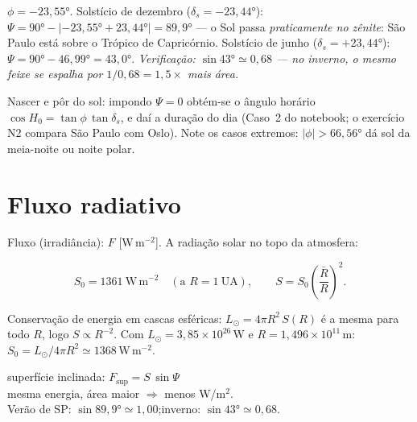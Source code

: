 \documentclass[11pt]{article}
\begin{document}
\begin{exemplo}
$\phi = -23{,}55°$. Solstício de dezembro ($\delta_s = -23{,}44°$):
$\Psi = 90° - |{-23{,}55°}+23{,}44°| = 89{,}9°$ — o Sol passa
\emph{praticamente no zênite}: São Paulo está sobre o Trópico de
Capricórnio. Solstício de junho ($\delta_s = +23{,}44°$):
$\Psi = 90° - 46{,}99° = 43{,}0°$.
\emph{Verificação: $\sin 43° \simeq 0{,}68$ — no inverno, o mesmo feixe se
espalha por $1/0{,}68 = 1{,}5\times$ mais área.}
\end{exemplo}

Nascer e pôr do sol: impondo $\Psi = 0$ obtém-se o ângulo horário
$\cos H_0 = \tan\phi\,\tan\delta_s$, e daí a duração do dia (Caso~2 do
notebook; o exercício N2 compara São Paulo com Oslo). Note os casos
extremos: $|\phi| > 66{,}56°$ dá sol da meia-noite ou noite polar.

\section{Fluxo radiativo}\label{sec:fluxo}


Fluxo (irradiância): $F$ [W\,m$^{-2}$]. A radiação solar no topo da
atmosfera:

\begin{formalivro}
\[ S_0 = 1361\ \mathrm{W\,m^{-2}} \quad(\text{a } R = 1\ \mathrm{UA}),\qquad
   S = S_0\left(\frac{\bar R}{R}\right)^{2}. \]
\end{formalivro}

\begin{formadif}
Conservação de energia em cascas esféricas: $L_\odot = 4\pi R^2\,S(R)$ é a
mesma para todo $R$, logo $S \propto R^{-2}$. Com
$L_\odot = 3{,}85\times10^{26}$\,W e $R = 1{,}496\times10^{11}$\,m:
$S_0 = L_\odot/4\pi R^2 \simeq 1368$\,W\,m$^{-2}$.
\end{formadif}

\begin{noquadro}
superfície inclinada: \quad $F_{\text{sup}} = S\,\sin\Psi$\\
mesma energia, área maior $\Rightarrow$ menos W/m$^2$.\\
Verão de SP: $\sin 89{,}9°\simeq 1{,}00$;\quad inverno: $\sin 43°\simeq0{,}68$.
\end{noquadro}
\end{document}

